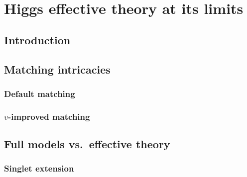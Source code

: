 
\chapter{Higgs effective theory at its limits}
\label{chapter:validity}


\section{Introduction}



\section{Matching intricacies}

\subsection{Default matching}

\subsection{$v$-improved matching}



\section{Full models vs.\ effective theory}

\subsection{Singlet extension}
\label{sec:validity_singlet}

